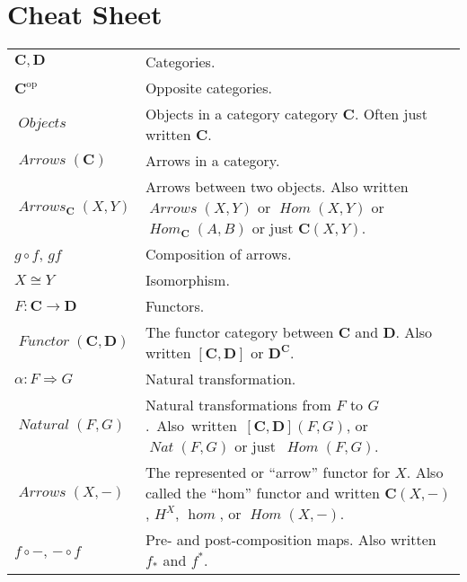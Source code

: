 \documentclass[12pt]{article}
\theoremstyle{definition}
\theoremstyle{definition}
\theoremstyle{definition}
\numberwithin{equation}{section}
\newcommand{\op}{\mathrm{op}}           %
\newcommand{\cat}[1]{\mathbf{#1}}      %
\newcommand{\CC}{\cat{C}}
\newcommand{\DD}{\cat{D}}
\DeclareMathOperator{\Arrows}{\mathit{Arrows}}
\DeclareMathOperator{\Objects}{\mathit{Objects}}
\DeclareMathOperator{\Hom}{\mathit{Hom}}
\DeclareMathOperator{\Nat}{\mathit{Natural}}
\DeclareMathOperator{\Fun}{\mathit{Functor}}
\newcommand{\iso}{\cong}                %
\newcommand{\fto}{\Rightarrow}
\begin{document}
\section{Cheat Sheet}
\small
\renewcommand{\arraystretch}{1.1}
\begin{tabularx}{.9\linewidth}{l X}
$\CC, \DD$ & Categories. \\
$\CC^\op$ & Opposite categories. \\
$\Objects$ & Objects in a category category $\CC$. Often just written $\CC$.\\
$\Arrows(\CC)$ & Arrows in a category. \\
$\Arrows_\CC(X,Y)$ & Arrows between two objects.  Also written $\Arrows(X,Y)$ or $\Hom(X,Y)$ 
or $\Hom_\CC(A, B)$ or just $\CC(X,Y)$. \\
$g \circ f$, $gf$ & Composition of arrows.\\
$X \iso Y$ & Isomorphism.\\
$F:\CC \to\DD$ & Functors.\\
$\Fun(\CC, \DD)$ & The functor category between $\CC$ and $\DD$. Also written $[\CC,\DD]$ or $\DD^\CC$.\\
$\alpha: F \fto G$ & Natural transformation.\\
$\Nat(F, G)$ & Natural transformations from $F$ to $G$.~Also~written~$[\CC,\DD](F,G)$, or~$\mathop{\mathit {Nat}}(F,G)$ or just~$\Hom(F,G)$. \\
$\Arrows(X, -)$ & The represented or ``arrow'' functor for $X$. Also called the ``hom'' functor and written 
$\CC(X,-)$, $H^X$, $\mathop{\mathit{hom}}$, or $\Hom(X,-)$. \\
$f \circ - $, $- \circ f$ & Pre- and post-composition maps. Also written $f_*$ and $f^*$.\\
\end{tabularx}
\end{document}
